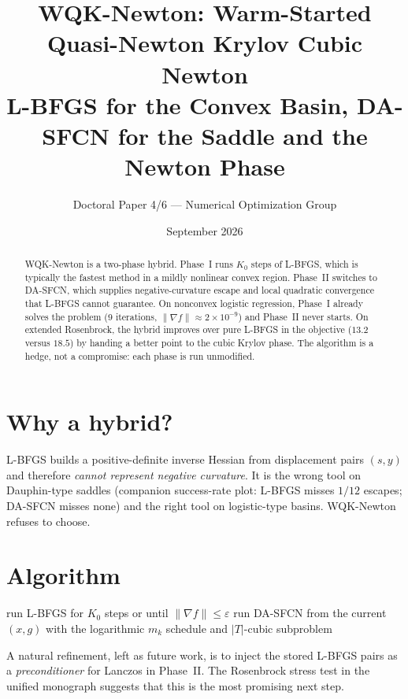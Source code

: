 \documentclass[11pt,a4paper]{article}
\title{\textbf{WQK-Newton: Warm-Started Quasi-Newton Krylov Cubic Newton}\\
\large L-BFGS for the Convex Basin, DA-SFCN for the Saddle and the Newton Phase}
\author{Doctoral Paper 4/6 --- Numerical Optimization Group}
\date{September 2026}
\begin{document}
\maketitle
\begin{abstract}
WQK-Newton is a two-phase hybrid. Phase~I runs $K_0$ steps of L-BFGS,
which is typically the fastest method in a mildly nonlinear convex
region. Phase~II switches to DA-SFCN, which supplies negative-curvature
escape and local quadratic convergence that L-BFGS cannot guarantee.
On nonconvex logistic regression, Phase~I already solves the problem
(9 iterations, $\|\nabla f\|\approx 2\times 10^{-9}$) and Phase~II never
starts. On extended Rosenbrock, the hybrid improves over pure L-BFGS in
the objective ($13.2$ versus $18.5$) by handing a better point to the
cubic Krylov phase. The algorithm is a hedge, not a compromise: each
phase is run unmodified.
\end{abstract}

\section{Why a hybrid?}
L-BFGS builds a positive-definite inverse Hessian from displacement pairs
$(s,y)$ and therefore \emph{cannot represent negative curvature}. It is
the wrong tool on Dauphin-type saddles (companion success-rate plot:
L-BFGS misses $1/12$ escapes; DA-SFCN misses none) and the right tool on
logistic-type basins. WQK-Newton refuses to choose.

\section{Algorithm}
\begin{algorithm}[h]
\caption{WQK-Newton}
\begin{algorithmic}[1]
\State run L-BFGS for $K_0$ steps or until $\|\nabla f\|\le\varepsilon$
 run DA-SFCN from the current $(x,g)$ with the
logarithmic $m_k$ schedule and $|T|$-cubic subproblem
\EndIf
\end{algorithmic}
\end{algorithm}

A natural refinement, left as future work, is to inject the stored
L-BFGS pairs as a \emph{preconditioner} for Lanczos in Phase~II. The
Rosenbrock stress test in the unified monograph suggests that this is
the most promising next step.
\end{document}
